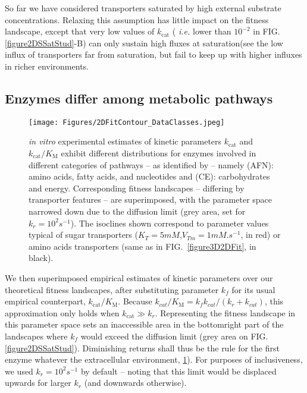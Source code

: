 \documentclass[11pt,onecolumn]{article}
\newcommand{\othercaption}[1]{\caption{\setlength{\baselineskip}{1.5\baselineskip}#1}}
\providecommand{\DIFadd}[1]{{\protect\color{blue} \sf #1}} %
\providecommand{\DIFdel}[1]{{\protect\color{red} \scriptsize #1}} %
\providecommand{\DIFaddbegin}{} %
\providecommand{\DIFaddend}{} %
\providecommand{\DIFdelbegin}{} %
\providecommand{\DIFdelend}{} %
\providecommand{\DIFaddFL}[1]{\DIFadd{#1}} %
\providecommand{\DIFaddendFL}{} %
\providecommand{\DIFdelbeginFL}{} %
\begin{document}
\begin{figure*}[h!]
\DIFaddFL{Other parameter values: $k_r=1000/s$, $[E_{tot}]=1mM$ and $[S_{env}]=10 \times K_T$.}\DIFaddendFL }
\label{figure2DSSatStud}
\DIFdelbeginFL %
\DIFdelend \DIFaddbegin \end{figure*}
\DIFaddend 

So far we have considered transporters saturated by high external substrate concentrations. Relaxing this assumption has little impact on the fitness landscape, except that very low values of $k_\text{cat}$ (\DIFdelbegin \DIFdel{\textit{i.e.} }\DIFdelend lower than $10^{-2}$ \DIFaddbegin \DIFadd{in FIG. \ref{figure2DSSatStud}-B}\DIFaddend ) can only sustain \DIFdelbegin \DIFdel{high fluxes at saturation(see }\DIFdelend \DIFaddbegin \DIFadd{the low influx of transporters far from saturation, but fail to keep up with higher influxes in richer environments. 
}

\subsection{\DIFadd{Enzymes differ among metabolic pathways}}

\begin{figure}[h!]
\centering
\texttt{[image: Figures/2DFitContour\_DataClasses.jpeg]}  
\othercaption{\textit{in vitro} experimental estimates of kinetic parameters $k_\text{cat}$ and $k_\text{cat}/K_\text{M}$ exhibit different distributions for enzymes involved in different categories of pathways -- as identified by \citet{Bar-Even11} -- namely (AFN): amino acids, fatty acids, and nucleotides and (CE): carbohydrates and energy. Corresponding fitness landscapes -- differing by transporter features -- are superimposed, with the parameter space narrowed down due to the diffusion limit (grey area, set for $k_r=10^2 s^{-1}$). The isoclines shown correspond to parameter values typical of sugar transporters ($K_T=5mM$,$V_{Tm}=1mM.s^{-1}$, in red) \citep{Maier02} or amino acids transporters (same as in FIG.~\ref{figure3D2DFit}, in black).}
\label{figure2D_BarEven_Dataset}
\end{figure}

\DIFadd{We then superimposed empirical estimates of kinetic parameters over our theoretical fitness landscapes, after substituting parameter $k_f$ for its usual empirical counterpart, $k_\text{cat} / K_\text{M}$. Because $k_{cat}/K_\text{M} = k_fk_{cat}/(k_r+k_{cat})$, this approximation only holds when $k_\text{cat} \gg k_r$. Representing the fitness landscape in this parameter space
sets an inaccessible area in the bottomright part of the landscapes where $k_f$ would exceed the diffusion limit (grey area on }\DIFaddend FIG.~\DIFdelbegin \DIFdel{\ref{figure2DSSatStud}). Diminishing returns shall thus be the rule for the first enzyme whatever the extracellular environment, }\DIFdelend \DIFaddbegin \DIFadd{\ref{figure2D_BarEven_Dataset}). For purposes of inclusiveness, we used $k_r=10^{2}s^{-1}$ by default -- noting that this limit would be displaced upwards for larger $k_r$ (and downwards otherwise).
}
\end{document}
